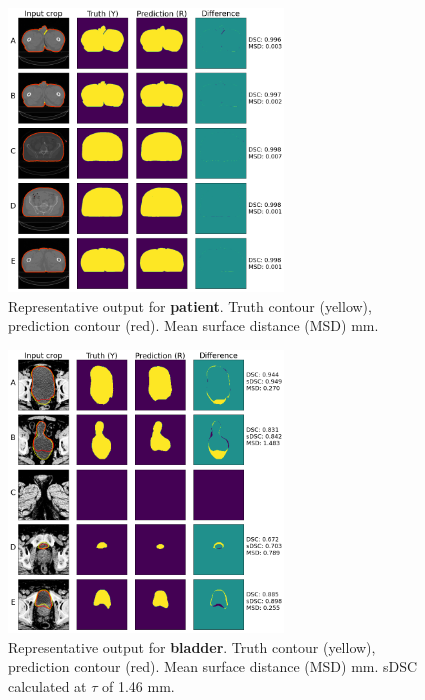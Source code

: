 \documentclass[9pt]{beamer}
\begin{document}
\begin{frame}
\begin{figure}
\includegraphics[width=0.65\textwidth]{images/prostate_patient}
\caption{Representative output for \textbf{patient}. Truth contour (yellow), prediction contour (red). Mean surface distance (MSD) mm.}
\end{figure}
\end{frame}
%
\begin{frame}
\begin{figure}
\includegraphics[width=0.65\textwidth]{images/prostate_bladder}
\caption{Representative output for \textbf{bladder}. Truth contour (yellow), prediction contour (red). Mean surface distance (MSD) mm. sDSC calculated at $\tau$ of 1.46 mm.\footnotemark[2]}
\end{figure}
\end{frame}
\end{document}
